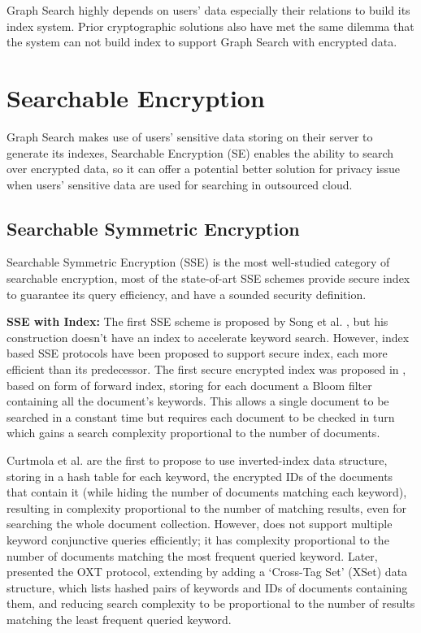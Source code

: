 Graph Search highly depends on users' data especially their relations to build its index system. Prior cryptographic solutions also have met the same dilemma that the system can not build index to support Graph Search with encrypted data. 

\section{Searchable Encryption}
Graph Search makes use of users' sensitive data storing on their server to generate its indexes, Searchable Encryption (SE) enables the ability to search over encrypted data, so it can offer a potential better solution for privacy issue when users' sensitive data are used for searching in outsourced cloud.

\subsection{Searchable Symmetric Encryption}
Searchable Symmetric Encryption (SSE) is  the most well-studied category of searchable encryption, most of the state-of-art SSE schemes provide secure index to guarantee its query efficiency, and have a sounded security definition.

{\bf SSE with Index:} The first SSE scheme is proposed by Song et al. \cite{song2000practical}, but his construction doesn't have an index to accelerate keyword search. However, index based SSE protocols have been proposed to support secure index, each more efficient than its predecessor. 
The first secure encrypted index was proposed in \cite{goh2003secure}, based on form of forward index, storing for each document a Bloom filter containing all the document's keywords. This allows a single document to be searched in a constant time but requires each document to be checked in turn which gains a search complexity proportional to the number of documents.

Curtmola et al. \cite{curtmola2011searchable} are the first to propose to use inverted-index data structure, storing in a hash table for each keyword, the encrypted IDs of the documents that contain it (while hiding the number of documents matching each keyword), resulting in complexity proportional to the number of matching results, even for searching the whole document collection. However, \cite{curtmola2011searchable} does not support multiple keyword conjunctive queries efficiently; it has complexity proportional to the number of documents matching the most frequent queried keyword. 
Later, \cite{cash2013highly} presented the OXT protocol, extending \cite{curtmola2011searchable} by adding a `Cross-Tag Set' (XSet) data structure, which lists hashed pairs of keywords and IDs of documents containing them, and reducing search complexity to be proportional to the number of results matching the least frequent queried keyword.

